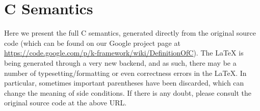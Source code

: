 \documentclass{article}
\begin{document}
\section{C Semantics}
Here we present the full C semantics, generated directly from the original source code (which can be found on our Google project page at \url{https://code.google.com/p/k-framework/wiki/DefinitionOfC}).  The \LaTeX{} is being generated through a very new backend, and as such, there may be a number of typesetting/formatting or even correctness errors in the \LaTeX{}.  In particular, sometimes important parentheses have been discarded, which can change the meaning of side conditions.  If there is any doubt, please consult the original source code at the above URL.

\eject \pdfpagewidth=15in \pdfpageheight=9in



\end{document}
